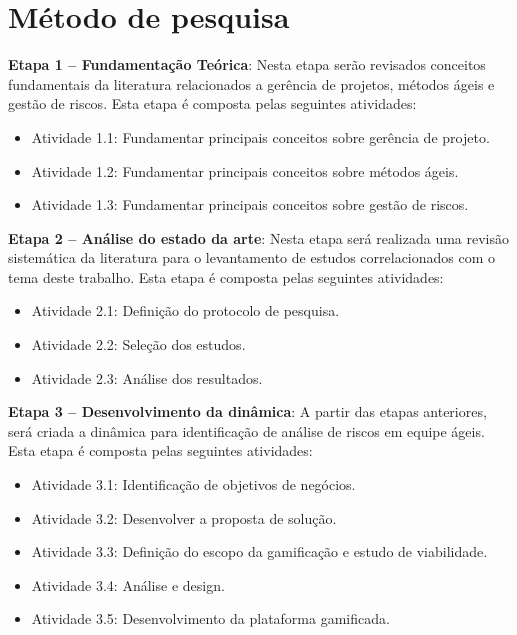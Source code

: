 \documentclass[
	12pt,
	openright,
	twoside,
	a4paper,
	english,
	brazil
	]{abntex2}
\begin{document}
\section{Método de pesquisa}

\textbf{Etapa 1 -- Fundamentação Teórica}: Nesta etapa serão revisados conceitos fundamentais da literatura relacionados a gerência de projetos, métodos ágeis e gestão de riscos. Esta etapa é composta pelas seguintes atividades:

\begin{itemize}
  \item[] Atividade 1.1: Fundamentar principais conceitos sobre gerência de projeto.
  \item[] Atividade 1.2: Fundamentar principais conceitos sobre métodos ágeis.
  \item[] Atividade 1.3: Fundamentar principais conceitos sobre gestão de riscos.
\end{itemize}


\textbf{Etapa 2 -- Análise do estado da arte}: Nesta etapa será realizada uma revisão sistemática da literatura para o levantamento de estudos correlacionados com o tema deste trabalho. Esta etapa é composta pelas seguintes atividades:

\begin{itemize}
  \item[] Atividade 2.1: Definição do protocolo de pesquisa.
  \item[] Atividade 2.2: Seleção dos estudos.
  \item[] Atividade 2.3: Análise dos resultados.
\end{itemize}

\textbf{Etapa 3 -- Desenvolvimento da dinâmica}: A partir das etapas anteriores, será criada a dinâmica para identificação de análise de riscos em equipe ágeis. Esta etapa é composta pelas seguintes atividades:

\begin{itemize}

  \item[] Atividade 3.1: Identificação de objetivos de negócios.
  \item[] Atividade 3.2: Desenvolver a proposta de solução.
  \item[] Atividade 3.3: Definição do escopo da gamificação e estudo de viabilidade.
  \item[] Atividade 3.4: Análise e design.
  \item[] Atividade 3.5: Desenvolvimento da plataforma gamificada.

\end{itemize}
\end{document}
